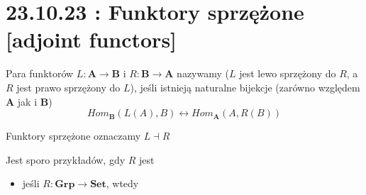 \section{23.10.23 : Funktory sprzężone [adjoint functors]}


\begin{definition}
  Para funktorów $L:\mathbf{A}\to\mathbf{B}$ i $R:\mathbf{B}\to\mathbf{A}$ nazywamy  ($L$ jest lewo sprzężony do $R$, a $R$ jest prawo sprzężony do $L$), jeśli istnieją naturalne bijekcje (zarówno względem $\mathbf{A}$ jak i $\mathbf{B}$)
  $$Hom_{\mathbf{B}}(L(A),B)\longleftrightarrow Hom_{\mathbf{A}}(A,R(B))$$

  Funktory sprzężone oznaczamy $L\dashv R$
\end{definition}

\begin{example}
  \item Jest sporo przykładów, gdy $R$ jest 
    \begin{itemize}
      \item jeśli $R:\mathbf{Grp}\to\mathbf{Set}$, wtedy

        \begin{center}\end{center}


\end{itemize}
\end{example}
